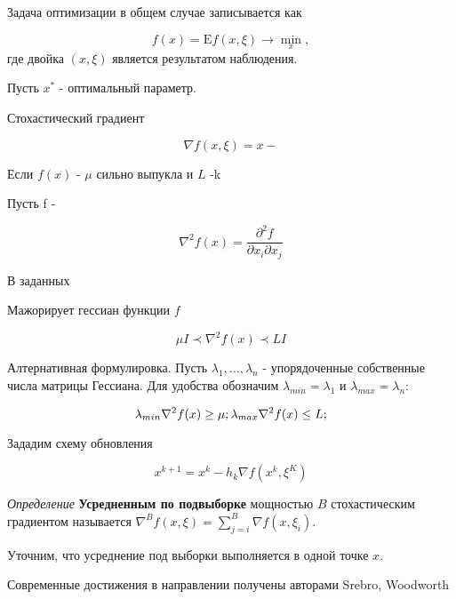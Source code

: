Задача оптимизации  в общем случае записывается как \cite{nesterov2015universal}

\begin{equation}
    f(x) = \mathrm{E} f(x,\xi) \rightarrow \min_x,
\end{equation}
где двойка $(x,\xi)$ является результатом наблюдения.


Пусть $x^*$ - оптимальный параметр.

 Стохастический градиент 

\begin{equation}
    \nabla f(x,\xi) = x - 
\end{equation}

Если $f(x)$ - $\mu$ сильно выпукла и $L$ -k

Пусть f - 

\begin{equation}
    \nabla^2 f(x) = \frac{\partial^2 f}{\partial x_i \partial x_j} 
\end{equation}

В заданных 


Мажорирует гессиан функции $f$

\begin{equation}
    \mu I \prec \nabla^2 f(x) \prec L I 
\end{equation}

Алтернативная формулировка. Пусть $\lambda_1, \dots, \lambda_n$ - упорядоченные собственные числа матрицы Гессиана. Для удобства обозначим
$\lambda_{min} = \lambda_1$ и $\lambda_{max} = \lambda_n$:

\begin{equation}
    \lambda_{min} \nabla^2 f(x) \ge \mu; \\
    \lambda_{max} \nabla^2 f(x) \le L;
\end{equation}

Зададим схему обновления 

\begin{equation}
    x^{k+1} = x^k - h_k \nabla f(x^k, \xi^K)
\end{equation}

\textit{Определение} \textbf{Усредненным по подвыборке} мощностью $B$ стохастическим градиентом называется 
$\nabla^B f(x,\xi) = \sum_{j=i}^B \nabla f(x,\xi_i)$.

Уточним, что усреднение под выборки выполняется в одной точке $x$.

Современные достижения в направлении получены авторами Srebro, Woodworth \cite{NEURIPS2021_3c63ec7b} \cite{woodworth2016tight}

